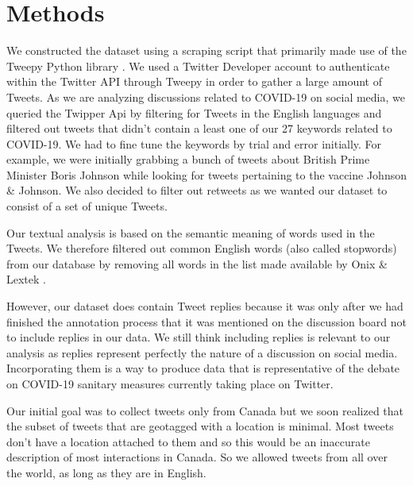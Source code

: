 \documentclass[letterpaper]{article} %
\begin{document}
\section{Methods}



We constructed the dataset using a scraping script that primarily made use of
the Tweepy Python library \cite{roesslein2020tweepy}. We used a Twitter
Developer account to authenticate within the Twitter API through Tweepy in order
to gather a large amount of Tweets. As we are analyzing discussions related to
COVID-19 on social media, we queried the Twipper Api by filtering for Tweets in
the English languages and filtered out tweets that didn't contain a least one of
our 27 keywords related to COVID-19. We had to fine tune
the keywords by trial and error initially. For example, we were initially
grabbing a bunch of tweets about British Prime Minister Boris Johnson while
looking for tweets pertaining to the vaccine Johnson \& Johnson.
We also decided to filter out retweets as
we wanted our dataset to consist of a set of unique Tweets. 

Our textual analysis is based on the semantic meaning of words used in the Tweets. We therefore filtered out common English words (also called stopwords) from our database by removing all words in the list made available by Onix \& Lextek \cite{BrigadirRepo}. 

However, our dataset does contain Tweet replies because it was only after we had
finished the annotation process that it was mentioned on the discussion board
not to include replies in our data. We still think including replies is relevant
to our analysis as replies represent perfectly the nature of a discussion on
social media. Incorporating them is a way to produce data that is representative
of the debate on COVID-19 sanitary measures currently taking place on Twitter.

Our initial goal was to collect tweets only from Canada but we soon realized
that the subset of tweets that are geotagged with a location is minimal. Most
tweets don't have a location attached to them and so this would be an inaccurate
description of most interactions in Canada. So we allowed tweets from all over
the world, as long as they are in English.
\end{document}
